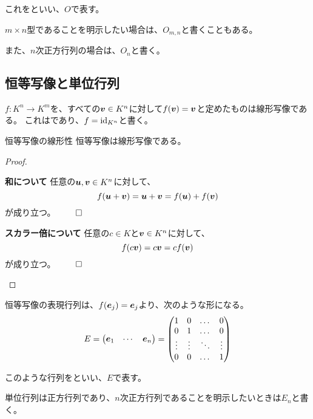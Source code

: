 \documentclass[../../../topic_linear-algebra]{subfiles}
\begin{document}
これをといい、$O$で表す。

\br

$m \times n$型であることを明示したい場合は、$O_{m,n}$と書くこともある。

また、$n$次正方行列の場合は、$O_n$と書く。

\subsection{恒等写像と単位行列}

$f\colon K^n \to K^m$を、すべての$\vb*{v} \in K^n$に対して$f(\vb*{v}) = \vb*{v}$と定めたものは線形写像である。
これはであり、$f = \operatorname{id}_{K^n}$と書く。

\begin{theorem*}{恒等写像の線形性}
  恒等写像は線形写像である。
\end{theorem*}

\begin{proof}
  \begin{subpattern}{\bfseries 和について}
    任意の$\vb*{u},\vb*{v}\in K^n$に対して、
    \begin{equation*}
      f(\vb*{u}+\vb*{v})=\vb*{u}+\vb*{v}=f(\vb*{u})+f(\vb*{v})
    \end{equation*}
    が成り立つ。 $\qed$
  \end{subpattern}
  
  \begin{subpattern}{\bfseries スカラー倍について}
    任意の$c\in K$と$\vb*{v}\in K^n$に対して、
    \begin{equation*}
      f(c\vb*{v})=c\vb*{v}=cf(\vb*{v})
    \end{equation*}
    が成り立つ。 $\qed$
  \end{subpattern}
\end{proof}

\br

恒等写像の表現行列は、$f(\vb*{e}_j) = \vb*{e}_j$より、次のような形になる。
\begin{equation*}
  E = \begin{pmatrix}
    \vb*{e}_1 & \cdots & \vb*{e}_n
  \end{pmatrix} = \begin{pmatrix}
      1      & 0      & \dots  & 0      \\
      0      & 1      & \dots  & 0      \\
      \vdots & \vdots & \ddots & \vdots \\
      0      & 0      & \dots  & 1
    \end{pmatrix}
\end{equation*}

このような行列をといい、$E$で表す。

単位行列は正方行列であり、$n$次正方行列であることを明示したいときは$E_n$と書く。
\end{document}
